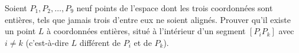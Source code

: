 Soient $P_1, P_2, \ldots, P_9$ neuf points de l'espace dont les trois
coordonnées sont entières, tels que jamais trois d'entre eux ne soient
alignés. Prouver qu'il existe un point $L$ à coordonnées entières, situé à
l'intérieur d'un segment $[P_i P_k]$ avec $i \neq k$ (c'est-à-dire $L$
différent de $P_i$ et de $P_k$).

